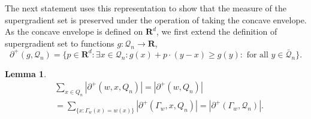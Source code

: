 \documentclass[12pt]{amsart}
\newcommand{\R}{\mathbf{R}}
\newtheorem{lemma}[theorem]{Lemma}
\begin{document}
The next statement uses this representation to show that the measure of the supergradient set is preserved under the operation of taking the concave envelope. As the concave envelope is defined on $\R^d$, we first extend the definition of supergradient set
to functions $g: \mathcal{Q}_n \to \R$, 
\begin{equation}
\partial^+(g, \mathcal{Q}_n) = \{p \in \R^d: \exists x \in \mathcal{Q}_n : g(x) + p \cdot (y-x) \geq g(y) : \mbox{ for all $y \in \mathcal{\bar{Q}}_n$}\}.
\end{equation}



\begin{lemma} \label{MA-rep} 
\[
\begin{aligned}
&\sum_{x \in Q_n} |\partial^+(w, x, Q_n)| = |\partial^+(w, Q_n)| \\
&=  \sum_{\{ x: \Gamma_w(x) = w(x) \}}  |\partial^+(\Gamma_w, x, Q_n)| = |\partial^+(\Gamma_w, \mathcal{Q}_n)|. 
\end{aligned}
\]
\end{lemma}
\end{document}
